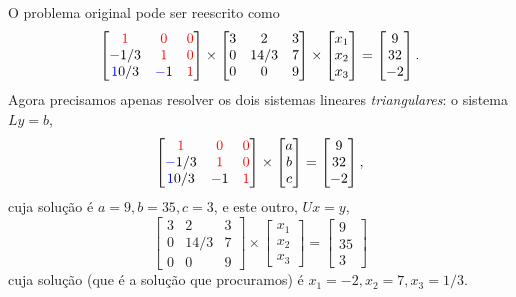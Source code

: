 \begin{ex}
\begin{sol}
\begin{enumerate}[label=\alph*)]
O problema original pode ser reescrito como 
$$\begin{bmatrix}
{\textcolor{red}1}	&{\textcolor{red}0}	&{\textcolor{red}0}\\
{\textcolor{blue}-1/3 }	&{\textcolor{red}1}	&{\textcolor{red}0}\\
{\textcolor{blue} 10/3 }	&{\textcolor{blue}-1}	&{\textcolor{red}1}
\end{bmatrix}\times 
\begin{bmatrix}
3	&2	&3\\
0	&14/3	&7\\
0	&0	&9
\end{bmatrix}\times
\begin{bmatrix}
x_1\\x_2\\x_3
\end{bmatrix}=
\begin{bmatrix}
9\\32\\-2
\end{bmatrix}.$$
Agora precisamos apenas resolver os dois sistemas lineares \emph{triangulares}: o sistema $Ly=b$,
$$\begin{bmatrix}
{\textcolor{red}1}	&{\textcolor{red}0}	&{\textcolor{red}0}\\
{\textcolor{blue}-1/3 }	&{\textcolor{red}1}	&{\textcolor{red}0}\\
{\textcolor{blue} 10/3 }	&{\textcolor{blue}-1}	&{\textcolor{red}1}
\end{bmatrix}\times 
\begin{bmatrix}
a\\b\\c
\end{bmatrix}=
\begin{bmatrix}
9\\32\\-2
\end{bmatrix},$$
cuja solução é $a=9, b=35, c=3$, e este outro, $Ux=y$,
$$\begin{bmatrix}
3	&2	&3\\
0	&14/3	&7\\
0	&0	&9
\end{bmatrix}\times
\begin{bmatrix}
x_1\\x_2\\x_3
\end{bmatrix}=
\begin{bmatrix}
9\\35\\3
\end{bmatrix}
$$
cuja solução (que é a solução que procuramos) é $x_1=-2, x_2=7, x_3=1/3$.
\end{enumerate}
\end{sol}




\end{ex}

